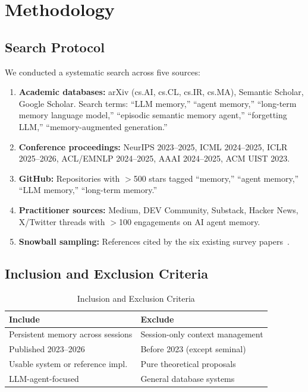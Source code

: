 \section{Methodology}
\label{sec:methodology}


\subsection{Search Protocol}

We conducted a systematic search across five sources:

\begin{enumerate}[leftmargin=*, nosep]
    \item \textbf{Academic databases:} arXiv (cs.AI, cs.CL, cs.IR,
    cs.MA), Semantic Scholar, Google Scholar. Search terms:
    ``LLM memory,'' ``agent memory,'' ``long-term memory language
    model,'' ``episodic semantic memory agent,'' ``forgetting LLM,''
    ``memory-augmented generation.''
    \item \textbf{Conference proceedings:} NeurIPS 2023--2025, ICML
    2024--2025, ICLR 2025--2026, ACL/EMNLP 2024--2025, AAAI 2024--2025,
    ACM UIST 2023.
    \item \textbf{GitHub:} Repositories with $>$500 stars tagged
    ``memory,'' ``agent memory,'' ``LLM memory,'' ``long-term memory.''
    \item \textbf{Practitioner sources:} Medium, DEV Community, Substack,
    Hacker News, X/Twitter threads with $>$100 engagements on AI
    agent memory.
    \item \textbf{Snowball sampling:} References cited by the six
    existing survey papers~\cite{sumers2024coala, gao2023rag,
    zhang2024survey, hu2025memory, wu2025memory, du2025memory}.
\end{enumerate}

\subsection{Inclusion and Exclusion Criteria}

\begin{table}[h]
\centering
\caption{Inclusion and Exclusion Criteria}
\label{tab:criteria}
\begin{tabular}{@{}ll@{}}
\toprule
\textbf{Include} & \textbf{Exclude} \\
\midrule
Persistent memory across sessions & Session-only context management \\
Published 2023--2026 & Before 2023 (except seminal) \\
Usable system or reference impl. & Pure theoretical proposals \\
LLM-agent-focused & General database systems \\
\bottomrule
\end{tabular}
\end{table}

